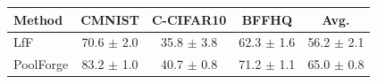 \begin{tabular}{lcccc}
\toprule
Method & CMNIST & C-CIFAR10 & BFFHQ & Avg. \\
\midrule
LfF & 70.6 $\pm$ 2.0 & 35.8 $\pm$ 3.8 & 62.3 $\pm$ 1.6 & 56.2 $\pm$ 2.1 \\
\rowcolor{ours}PoolForge & 83.2 $\pm$ 1.0 & 40.7 $\pm$ 0.8 & 71.2 $\pm$ 1.1 & 65.0 $\pm$ 0.8 \\
\bottomrule
\end{tabular}
